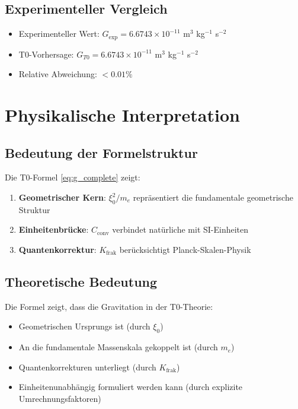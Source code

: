 \documentclass[12pt,a4paper]{article}
\newcommand{\Kfrak}{K_{\text{frak}}}
\newcommand{\Cconv}{C_{\text{conv}}}
\begin{document}
	\subsection{Experimenteller Vergleich}
	
	\begin{keyresult}
		\begin{itemize}
			\item Experimenteller Wert: $G_{\exp} = 6.6743 \times 10^{-11}$ m$^3$ kg$^{-1}$ s$^{-2}$
			\item T0-Vorhersage: $G_{T0} = 6.6743 \times 10^{-11}$ m$^3$ kg$^{-1}$ s$^{-2}$
			\item Relative Abweichung: $< 0.01\%$
		\end{itemize}
	\end{keyresult}
	
	\section{Physikalische Interpretation}
	
	\subsection{Bedeutung der Formelstruktur}
	
	Die T0-Formel \eqref{eq:g_complete} zeigt:
	
	\begin{enumerate}
		\item \textbf{Geometrischer Kern}: $\xi_0^2/m_e$ repräsentiert die fundamentale geometrische Struktur
		\item \textbf{Einheitenbrücke}: $\Cconv$ verbindet natürliche mit SI-Einheiten
		\item \textbf{Quantenkorrektur}: $\Kfrak$ berücksichtigt Planck-Skalen-Physik
	\end{enumerate}
	
	\subsection{Theoretische Bedeutung}
	
	Die Formel zeigt, dass die Gravitation in der T0-Theorie:
	\begin{itemize}
		\item Geometrischen Ursprungs ist (durch $\xi_0$)
		\item An die fundamentale Massenskala gekoppelt ist (durch $m_e$)
		\item Quantenkorrekturen unterliegt (durch $\Kfrak$)
		\item Einheitenunabhängig formuliert werden kann (durch explizite Umrechnungsfaktoren)
	\end{itemize}
	
\end{document}
